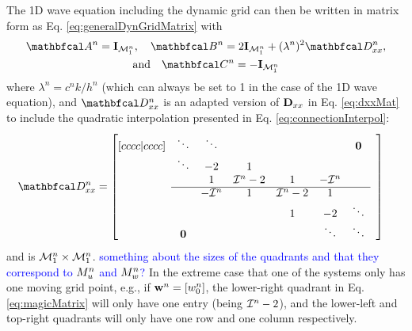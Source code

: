 \documentclass[fleqn]{jaes}
\def\SWcomment[#1]{\textcolor{blue}{#1}}
\begin{document}
The 1D wave equation including the dynamic grid can then be written in matrix form as Eq. \eqref{eq:generalDynGridMatrix} with
\begin{equation}\label{eq:1DwaveDynMatrix}
\begin{gathered}
    \AA = \I_{\MoneD}, \quad \BB = 2\I_\MoneD + (\lambda^n)^2\DDxx,\\
\text{and} \quad\CC = -\I_{\MoneD}
\end{gathered}
\end{equation}
where $\lambda^n = c^nk/h^n$ (which can always be set to 1 in the case of the 1D wave equation), and $\DDxx$ is an adapted version of $\mathbf{D}_{xx}$ in Eq. \eqref{eq:dxxMat} to include the quadratic interpolation presented in Eq. \eqref{eq:connectionInterpol}:
\begin{equation}\label{eq:magicMatrix}
    \!\!\!\!\!\!\DDxx = \begin{bmatrix}[cccc|cccc]
     & \ddots  &\ddots & & & & \mathbf{0} & \\
       & \ddots & -2 & 1 & & & & \\
      & & 1 & \Aterm -2 & 1 & -\Aterm & \\ \cline{2-7}
      & & -\Aterm & 1 & \Aterm -2 & 1 & & \\
         & & & &1 & -2 & \ddots  \\
         & \mathbf{0} & &  &  &\ddots & \ddots &
    \end{bmatrix}
\end{equation}
and is ${\mathcal{M}_1^n} \times {\mathcal{M}_1^n}$. \SWcomment[something about the sizes of the quadrants and that they correspond to $M_u^n$ and $M_w^n$?] In the extreme case that one of the systems only has one moving grid point, e.g., if $\mathbf{w}^n =[w_0^n]$, the lower-right quadrant in Eq. \eqref{eq:magicMatrix} will only have one entry (being $\mathcal{I}^n-2$), and the lower-left and top-right quadrants will only have one row and one column respectively. 
\end{document}
